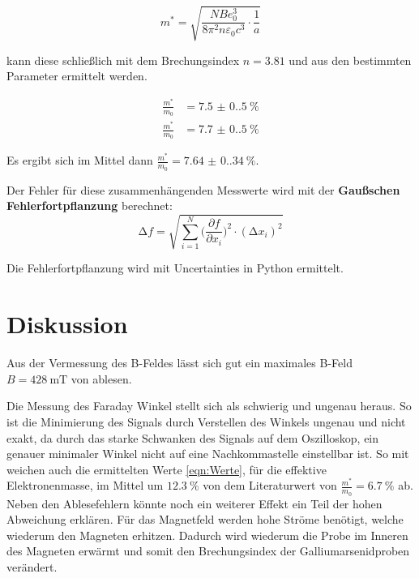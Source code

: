 \begin{equation}
	m^{\ast}=\sqrt{\frac{NBe_0^3}{8 \pi^2 n \varepsilon_0 c^3} \cdot \frac{1}{a}}
\end{equation}

kann diese schließlich mit dem Brechungsindex $n=3.81$
\cite{web:Brechungsindex} und aus den bestimmten Parameter ermittelt werden.

\begin{align}
	\frac{m^{\ast}}{m_0} & =\qty{7.5(0.5)}{\%} \\
	\frac{m^{\ast}}{m_0} & =\qty{7.7(0.5)}{\%}
	\label{eqn:Werte}
\end{align}

Es ergibt sich im Mittel dann $\frac{m^{\ast}}{m_0}=\qty{7.64(0.34)}{\%}$.

Der Fehler für diese zusammenhängenden Messwerte wird mit der \textbf{Gaußschen
	Fehlerfortpflanzung} berechnet:
\begin{equation}
	\increment{f} = \sqrt{ \sum_{i = 1}^{N}  \biggl(\frac{\partial{f}}{\partial{x_i}}\biggr)^2\cdot(\increment{x_i})^2}
	\label{eqn:Gauss}
\end{equation}

Die Fehlerfortpflanzung wird mit Uncertainties in Python \cite{uncertainties}
ermittelt.


\section{Diskussion}
Aus der Vermessung des B-Feldes lässt sich gut ein maximales B-Feld
$B=\qty{428}{\milli\tesla}$ von ablesen.

Die Messung des Faraday Winkel stellt sich als schwierig und ungenau heraus. So
ist die Minimierung des Signals durch Verstellen des Winkels ungenau und nicht
exakt, da durch das starke Schwanken des Signals auf dem Oszilloskop, ein
genauer minimaler Winkel nicht auf eine Nachkommastelle einstellbar ist. So mit
weichen auch die ermittelten Werte \eqref{eqn:Werte}, für die effektive
Elektronenmasse, im Mittel um $\qty{12.3}{\%}$ von dem Literaturwert von
$\frac{m^{\ast}}{m_0}=\qty{6.7}{\%}$ \cite{web:GaAs} ab. Neben den
Ablesefehlern könnte noch ein weiterer Effekt ein Teil der hohen Abweichung
erklären. Für das Magnetfeld werden hohe Ströme benötigt, welche wiederum den
Magneten erhitzen. Dadurch wird wiederum die Probe im Inneren des Magneten
erwärmt und somit den Brechungsindex der Galliumarsenidproben verändert.

